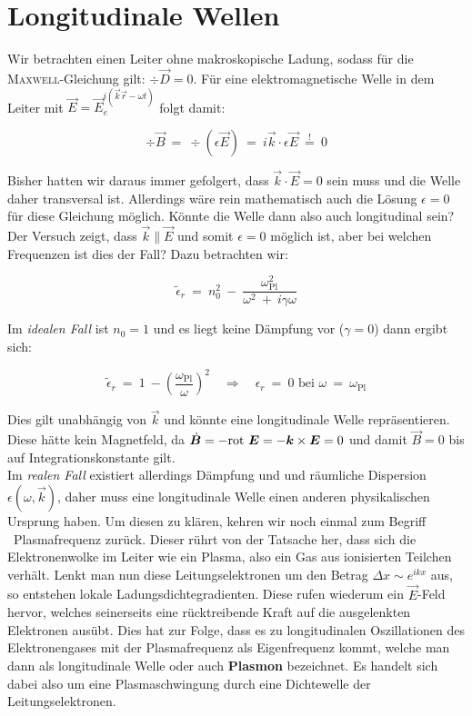 \section{Longitudinale Wellen}

Wir betrachten einen Leiter ohne makroskopische Ladung, sodass für die \textsc{Maxwell}-Gleichung gilt: $\div\vec{D}=0$. Für eine elektromagnetische Welle in dem Leiter mit $\vec{E}=\vec{E}_ e^{i(\vec{k}\vec{r}-\omega t)}$ folgt damit:

\begin{equation*}
\div \vec{B} \ = \ \div(\epsilon\vec{E})  \ = \ i\vec{k}\cdot \epsilon\vec{E} \ \overset{!}{=} \ 0
\end{equation*}

Bisher hatten wir daraus immer gefolgert, dass $\vec{k}\cdot\vec{E}=0$ sein muss und die Welle daher transversal ist. Allerdings wäre rein mathematisch auch die Lösung $\epsilon=0$ für diese Gleichung möglich. Könnte die Welle dann also auch longitudinal sein?\\
Der Versuch zeigt, dass $\vec{k}\parallel\vec{E}$ und somit $\epsilon =0$ möglich ist, aber bei welchen Frequenzen ist dies der Fall? Dazu betrachten wir:


\begin{equation*}
\tilde{\epsilon}_r  \ = \ n_0^2 \ - \ \frac{\omega_{\text{Pl}}^2}{\omega^2 \ + \ i \gamma\omega}
\end{equation*}

Im \emph{idealen Fall} ist $n_0=1$ und es liegt keine Dämpfung vor ($\gamma=0$) dann ergibt sich:

\begin{equation*}
\tilde{\epsilon}_r \ = \ 1 \ - \left(\frac{\omega_{\text{Pl}}}{\omega}\right)^2 \quad\Rightarrow\quad \epsilon_r \ = \ 0 \text{ bei } \omega \ = \ \omega_{\text{Pl}}
\end{equation*}

Dies gilt unabhängig von $\vec{k}$ und könnte eine longitudinale Welle repräsentieren. Diese hätte kein Magnetfeld, da $\dot{\bm{B}}= - \text{rot }\bm{E} = - \bm{k}\times\bm{E}= 0$ und damit $\vec{B}=0$ bis auf Integrationskonstante gilt.\\
Im \emph{realen Fall} existiert allerdings Dämpfung und und räumliche Dispersion $\epsilon(\omega,\vec{k})$, daher muss eine longitudinale Welle einen anderen physikalischen Ursprung haben. Um diesen zu klären, kehren wir noch einmal zum Begriff \ \grqq Plasmafrequenz\grqq{}  zurück.  Dieser rührt von der Tatsache her, dass sich die Elektronenwolke im Leiter wie ein Plasma, also ein Gas aus ionisierten Teilchen verhält. Lenkt man nun diese Leitungselektronen um den Betrag $\Delta x \sim e^{ikx}$ aus, so entstehen lokale Ladungsdichtegradienten. Diese rufen wiederum ein $\vec{E}$-Feld hervor, welches seinerseits eine rücktreibende Kraft auf die ausgelenkten Elektronen ausübt. Dies hat zur Folge, dass es zu longitudinalen Oszillationen des Elektronengases mit der Plasmafrequenz als Eigenfrequenz kommt, welche man dann als \grqq longitudinale Welle\grqq{} oder auch \textbf{\grqq Plasmon\grqq{}} bezeichnet.  Es handelt sich dabei also um eine Plasmaschwingung durch eine Dichtewelle der Leitungselektronen.


